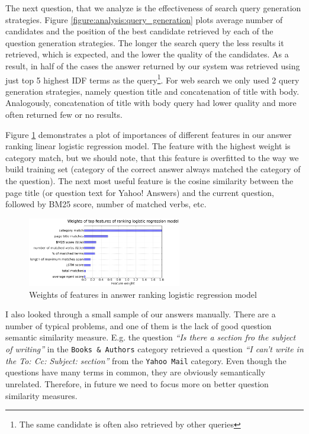 \documentclass[]{article}
\begin{document}
The next question, that we analyze is the effectiveness of search query generation strategies.
Figure \ref{figure:analysis:query_generation} plots average number of candidates and the position of the best candidate retrieved by each of the question generation strategies.
The longer the search query the less results it retrieved, which is expected, and the lower the quality of the candidates.
As a result, in half of the cases the answer returned by our system was retrieved using just top 5 highest IDF terms as the query\footnote{The same candidate is often also retrieved by other queries}.
For web search we only used 2 query generation strategies, namely question title and concatenation of title with body.
Analogously, concatenation of title with body query had lower quality and more often returned few or no results.

Figure \ref{figure:features} demonstrates a plot of importances of different features in our answer ranking linear logistic regression model.
The feature with the highest weight is category match, but we should note, that this feature is overfitted to the way we build training set (category of the correct answer always matched the category of the question).
The next most useful feature is the cosine similarity between the page title (or question text for Yahoo! Answers) and the current question, followed by BM25 score, number of matched verbs, etc.

\begin{figure}
\centering
	\includegraphics[width=0.6\textwidth]{img/features}
	\caption{Weights of features in answer ranking logistic regression model}
	\label{figure:features}
\end{figure}

I also looked through a small sample of our answers manually.
There are a number of typical problems, and one of them is the lack of good question semantic similarity measure.
E.g. the question \textit{``Is there a section fro the subject of writing''} in the \texttt{Books \& Authors} category retrieved a question \textit{``I can't write in the To: Cc: Subject: section''} from the \texttt{Yahoo Mail} category.
Even though the questions have many terms in common, they are obviously semantically unrelated.
Therefore, in future we need to focus more on better question similarity measures.
\end{document}
